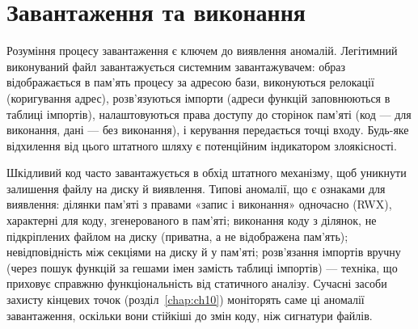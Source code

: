\begin{tikzfig}
\end{tikzfig}

\section{Завантаження та виконання}\label{sec:ch05-loading}

Розуміння процесу завантаження є ключем до виявлення аномалій. Легітимний виконуваний файл завантажується системним завантажувачем: образ відображається в пам'ять процесу за адресою бази, виконуються релокації (коригування адрес), розв'язуються імпорти (адреси функцій заповнюються в таблиці імпортів), налаштовуються права доступу до сторінок пам'яті (код --- для виконання, дані --- без виконання), і керування передається точці входу. Будь-яке відхилення від цього штатного шляху є потенційним індикатором злоякісності.

Шкідливий код часто завантажується в обхід штатного механізму, щоб уникнути залишення файлу на диску й виявлення. Типові аномалії, що є ознаками для виявлення: ділянки пам'яті з правами «запис і виконання» одночасно (RWX), характерні для коду, згенерованого в пам'яті; виконання коду з ділянок, не підкріплених файлом на диску (приватна, а не відображена пам'ять); невідповідність між секціями на диску й у пам'яті; розв'язання імпортів вручну (через пошук функцій за гешами імен замість таблиці імпортів) --- техніка, що приховує справжню функціональність від статичного аналізу. Сучасні засоби захисту кінцевих точок (розділ~\ref{chap:ch10}) моніторять саме ці аномалії завантаження, оскільки вони стійкіші до змін коду, ніж сигнатури файлів.

